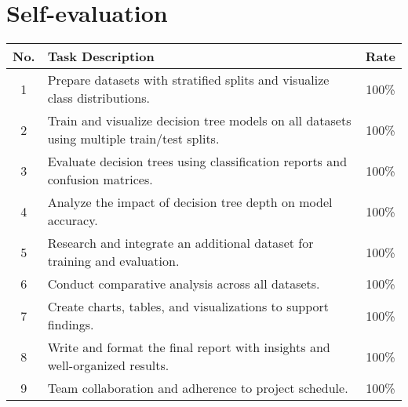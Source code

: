 \section{Self-evaluation}
\begin{center}
  \renewcommand{\arraystretch}{1.5}
  \begin{tabular}{|c|p{}|c|}
    \hline
    \textbf{No.} & \textbf{Task Description}                                                                  & \textbf{Rate} \\\hline
    1            & Prepare datasets with stratified splits and visualize class distributions.                 & 100\%         \\\hline
    2            & Train and visualize decision tree models on all datasets using multiple train/test splits. & 100\%         \\\hline
    3            & Evaluate decision trees using classification reports and confusion matrices.               & 100\%         \\\hline
    4            & Analyze the impact of decision tree depth on model accuracy.                               & 100\%         \\\hline
    5            & Research and integrate an additional dataset for training and evaluation.                  & 100\%         \\\hline
    6            & Conduct comparative analysis across all datasets.                                          & 100\%         \\\hline
    7            & Create charts, tables, and visualizations to support findings.                             & 100\%         \\\hline
    8            & Write and format the final report with insights and well-organized results.                & 100\%         \\\hline
    9            & Team collaboration and adherence to project schedule.                                      & 100\%         \\\hline
  \end{tabular}
\end{center}
